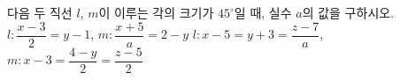 다음 두 직선 $l$, $m$이 이루는 각의 크기가 $45^\circ$일 때, 실수 $a$의 값을 구하시오.
 $l\colon \dfrac{x-3}{2}=y-1$, $m\colon \dfrac{x+5}{a}=2-y$
 $l\colon x-5=y+3=\dfrac{z-7}{a}$, $m\colon x-3=\dfrac{4-y}{2}=\dfrac{z-5}{2}$
